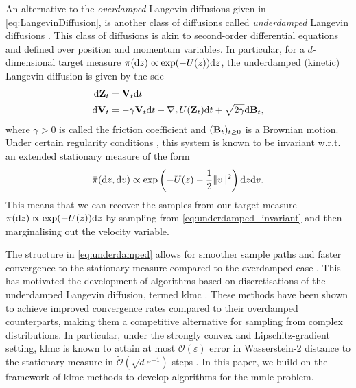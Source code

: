 An alternative to the \textit{overdamped} Langevin diffusions given in \eqref{eq:LangevinDiffusion}, is another class of diffusions called \textit{underdamped} Langevin diffusions \citep{Pavliotis_2014}. This class of diffusions is akin to second-order differential equations and defined over position and momentum variables. In particular, for a $d$-dimensional target measure $\pi({\mathrm d} z) \propto \exp(-U(z)){\mathrm d} z$, the underdamped (kinetic) Langevin diffusion is given by the \gls*{sde}
\begin{equation}\label{eq:underdamped}
\begin{aligned}
\mathrm{d}{\mathbf Z}_t &= {\mathbf V}_t \mathrm{d}t  \\
\mathrm{d}{\mathbf V}_t &= - \gamma {\mathbf V}_t \mathrm{d}t - \nabla_z U({\mathbf Z}_t)\mathrm{d}t + \sqrt{2\gamma}\mathrm{d}{\mathbf B}_t, 
\end{aligned}
\end{equation}
where $\gamma > 0$ is called the friction coefficient and $({\mathbf B}_t)_{t \geq 0}$ is a Brownian motion. Under certain regularity conditions \citep{Pavliotis_2014}, this system is known to be invariant w.r.t. an extended stationary measure of the form
\begin{equation}\label{eq:underdamped_invariant}
\bar{\pi}({\mathrm d} z, {\mathrm d} v) \propto \exp\left(-U(z) - \frac{1}{2}\|v\|^2\right) {\mathrm d} z {\mathrm d} v.
\end{equation}
This means that we can recover the samples from our target measure $\pi({\mathrm d} z) \propto \exp(-U(z)){\mathrm d} z$ by sampling from \eqref{eq:underdamped_invariant} and then marginalising out the velocity variable.

The structure in \eqref{eq:underdamped} allows for smoother sample paths and faster convergence to the stationary measure compared to the overdamped case \citep{cheng2018underdamped}. This has motivated the development of algorithms based on discretisations of the underdamped Langevin diffusion, termed \gls*{klmc} \citep{dalalyan2018sampling}. These methods have been shown to achieve improved convergence rates compared to their overdamped counterparts, making them a competitive alternative for sampling from complex distributions. In particular, under the strongly convex and Lipschitz-gradient setting, \gls*{klmc} is known to attain at most $\mathcal{O}(\varepsilon)$ error in Wasserstein-2 distance to the stationary measure in $\widetilde{\mathcal{O}}(\sqrt{d} \varepsilon^{-1})$ steps \citep{dalalyan2018sampling}. In this paper, we build on the framework of \gls*{klmc} methods to develop algorithms for the \gls*{mmle} problem.

